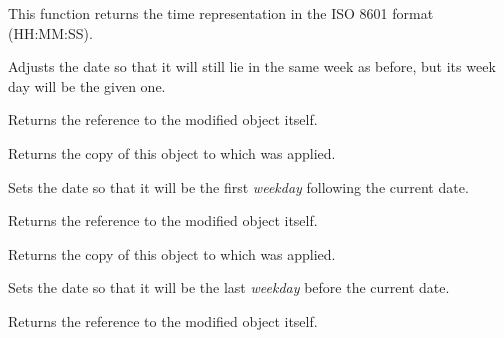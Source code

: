 \label{wxdatetimeformatisotime}


This function returns the time representation in the ISO 8601 format
(HH:MM:SS).


\label{wxdatetimesettoweekdayinsameweek}


Adjusts the date so that it will still lie in the same week as before, but its
week day will be the given one.

Returns the reference to the modified object itself.

\label{wxdatetimegetweekdayinsameweek}


Returns the copy of this object to which
 was
applied.

\label{wxdatetimesettonextweekday}


Sets the date so that it will be the first {\it weekday} following the current
date.

Returns the reference to the modified object itself.

\label{wxdatetimegetnextweekday}


Returns the copy of this object to which
 was applied.

\label{wxdatetimesettoprevweekday}


Sets the date so that it will be the last {\it weekday} before the current
date.

Returns the reference to the modified object itself.

\label{wxdatetimegetprevweekday}


